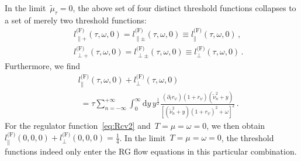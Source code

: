 \documentclass[prd,english,preprintnumbers,amsmath,amssymb,nofootinbib,twocolumn,superscriptaddress]{revtex4-1}
\newcommand{\be}{\begin{eqnarray}}
\newcommand{\ee}{\end{eqnarray}}
\newcommand{\del}{\partial}
\newcommand{\nn}{\nonumber }
\begin{document}
{{%
In the limit~$\tilde{\mu}_{\tau}=0$, the above set of four distinct threshold functions collapses to a set of merely two threshold functions:
%
\be
&& l^{\text{(F)}}_{\parallel +} (\tau, \omega, 0) = l^{\text{(F)}}_{\parallel \pm} (\tau, \omega, 0 )  \equiv l^{\text{(F)}}_{\parallel} (\tau, \omega, 0)\,,\nn \\
&& l^{\text{(F)}}_{\perp +} (\tau, \omega, 0) = l^{\text{(F)}}_{\perp \pm} (\tau, \omega, 0)  \equiv l^{\text{(F)}}_{\perp} (\tau, \omega, 0)\,.\nn
\ee
%
{Furthermore, we find
%
\be
&&\!\!\!\!\!\!\!\!\! l^{\text{(F)}}_{\parallel} (\tau, \omega, 0) +  l^{\text{(F)}}_{\perp} (\tau, \omega, 0)\nn\\
&&\; = \tau \sum _{n=-\infty}^{+\infty} \int _0 ^{\infty} \text{d} y \, y^{\frac{1}{2}}  
\frac{(\del_t r_\psi) (1+r_\psi)( \tilde \nu_n ^2 + y) } { \left[ \left( \tilde \nu_n ^2 + y \right) (1 + r_\psi )^2 + \omega \right]^2}\,.
\ee
%
For} the regulator function~\eqref{eq:Rcv2} and~$T=\mu=\omega=0$, we then obtain~$l^{\text{(F)}}_{\parallel} (0, 0, 0) +  l^{\text{(F)}}_{\perp} (0, 0, 0)= \frac{1}{4}$.
In the limit~$T=\mu=\omega=0$, the threshold functions indeed only enter the RG flow equations in this particular combination.

%
}}
\end{document}
